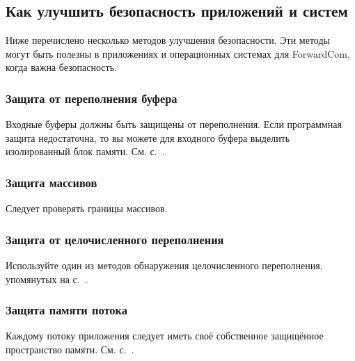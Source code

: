 \documentclass[forwardcom.tex]{subfiles}
\begin{document}
\subsection{Как улучшить безопасность приложений и систем}
Ниже перечислено несколько методов улучшения безопасности. Эти методы могут быть полезны в приложениях и операционных системах для ForwardCom, когда важна безопасность.

\subsubsection{Защита от переполнения буфера}
Входные буферы должны быть защищены от переполнения. Если программная защита недостаточна, то вы можете для входного буфера выделить изолированный блок памяти. См. с.~\pageref{isolatedMemoryBlocks}.

\subsubsection{Защита массивов} Следует проверять границы массивов.

\subsubsection{Защита от целочисленного переполнения} Используйте один из методов обнаружения целочисленного переполнения, упомянутых на с.~\pageref{integerOverflowDetection}.

\subsubsection{Защита памяти потока} Каждому потоку приложения следует иметь своё собственное защищённое пространство памяти. См. с.~\pageref{threadMemoryProtection}.
\end{document}
